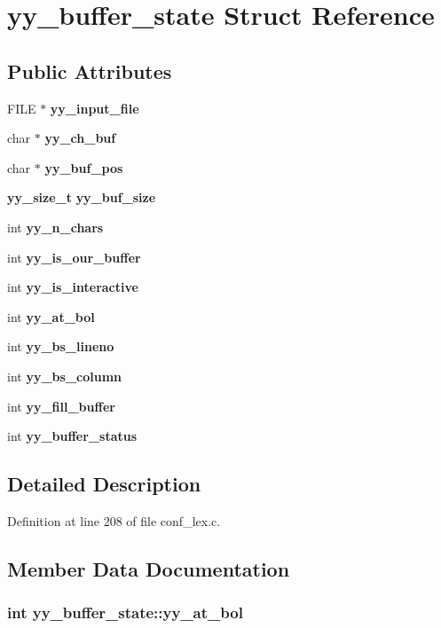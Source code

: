 \section{yy\_\-buffer\_\-state Struct Reference}
\label{structyy__buffer__state}
\subsection*{Public Attributes}
\begin{CompactItemize}
\item 
FILE $\ast$ {\bf yy\_\-input\_\-file}
\item 
char $\ast$ {\bf yy\_\-ch\_\-buf}
\item 
char $\ast$ {\bf yy\_\-buf\_\-pos}
\item 
{\bf yy\_\-size\_\-t} {\bf yy\_\-buf\_\-size}
\item 
int {\bf yy\_\-n\_\-chars}
\item 
int {\bf yy\_\-is\_\-our\_\-buffer}
\item 
int {\bf yy\_\-is\_\-interactive}
\item 
int {\bf yy\_\-at\_\-bol}
\item 
int {\bf yy\_\-bs\_\-lineno}
\item 
int {\bf yy\_\-bs\_\-column}
\item 
int {\bf yy\_\-fill\_\-buffer}
\item 
int {\bf yy\_\-buffer\_\-status}
\end{CompactItemize}


\subsection{Detailed Description}


Definition at line 208 of file conf\_\-lex.c.

\subsection{Member Data Documentation}
\subsubsection[{yy\_\-at\_\-bol}]{\setlength{\rightskip}{0pt plus 5cm}int {\bf yy\_\-buffer\_\-state::yy\_\-at\_\-bol}}\label{structyy__buffer__state_9d60c60af6e1a6f69de16871fd64f85f}




